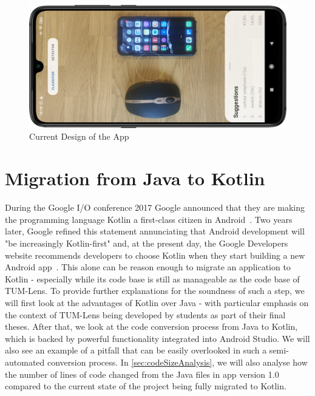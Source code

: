 \documentclass[
			   fontsize=11pt,
               paper=a4,
               bibliography=totoc,
               idxtotoc,
               headsepline,
               footsepline,
               footinclude=false,
               BCOR=12mm,
               DIV=13,
               openany,   %
               ]
               {scrbook}
\begin{document}
\bigskip

\begin{figure}[H]
	\centering
	\includegraphics[width=\textwidth]{figures/app_class_new_rot.png}
	\caption[Current Design of the App]{Current Design of the App}
	\label{fig:designUpdate}
\end{figure}

\chapter{Migration from Java to Kotlin}

During the Google I/O conference 2017 Google announced that they are making the programming language Kotlin a first-class citizen in Android~\cite{googleIO17}. Two years later, Google refined this statement annunciating that Android development will "be increasingly Kotlin-first" and, at the present day, the Google Developers website recommends developers to choose Kotlin when they start building a new Android app~\cite{kotlinFirst}. This alone can be reason enough to migrate an application to Kotlin - especially while its code base is still as manageable as the code base of TUM-Lens. To provide further explanations for the soundness of such a step, we will first look at the advantages of Kotlin over Java - with particular emphasis on the context of TUM-Lens being developed by students as part of their final theses. After that, we look at the code conversion process from Java to Kotlin, which is backed by powerful functionality integrated into Android Studio. We will also see an example of a pitfall that can be easily overlooked in such a semi-automated conversion process. In \autoref{sec:codeSizeAnalysis}, we will also analyse how the number of lines of code changed from the Java files in app version 1.0 compared to the current state of the project being fully migrated to Kotlin.
\end{document}
